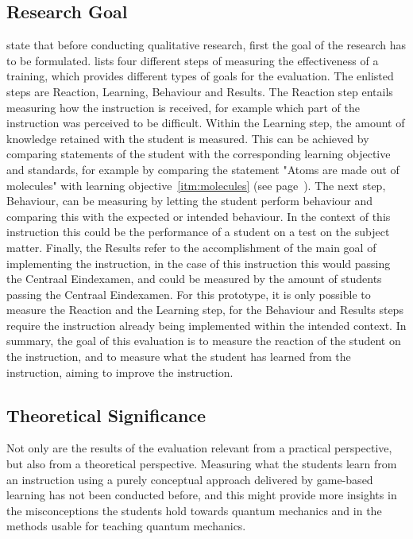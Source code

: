 \documentclass[11pt,twoside]{report} %
\begin{document}
\subsection{Research Goal}

 state that before conducting qualitative research, first the goal of the research has to be formulated.  lists four different steps of measuring the effectiveness of a training, which provides different types of goals for the evaluation. The enlisted steps are Reaction, Learning, Behaviour and Results. The Reaction step entails measuring how the instruction is received, for example which part of the instruction was perceived to be difficult. Within the Learning step, the amount of knowledge retained with the student is measured. This can be achieved by comparing statements of the student with the corresponding learning objective and standards, for example by comparing the statement "Atoms are made out of molecules" with learning objective~\ref{itm:molecules} (see page~\pageref{itm:molecules}). The next step, Behaviour, can be measuring by letting the student perform behaviour and comparing this with the expected or intended behaviour. In the context of this instruction this could be the performance of a student on a test on the subject matter. Finally, the Results refer to the accomplishment of the main goal of implementing the instruction, in the case of this instruction this would passing the Centraal Eindexamen, and could be measured by the amount of students passing the Centraal Eindexamen. For this prototype, it is only possible to measure the Reaction and the Learning step, for the Behaviour and Results steps require the instruction already being implemented within the intended context. In summary, the goal of this evaluation is to measure the reaction of the student on the instruction, and to measure what the student has learned from the instruction, aiming to improve the instruction.

\subsection{Theoretical Significance}

Not only are the results of the evaluation relevant from a practical perspective, but also from a theoretical perspective. Measuring what the students learn from an instruction using a purely conceptual approach delivered by game-based learning has not been conducted before, and this might provide more insights in the misconceptions the students hold towards quantum mechanics and in the methods usable for teaching quantum mechanics.
\end{document}
